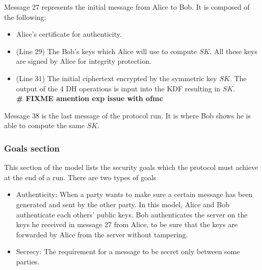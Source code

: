 Message 27 represents the initial message from Alice to Bob. It is composed of the following:
\begin{itemize}
	\item Alice's certificate for authenticity.
	\item (Line 29) The Bob's keys which Alice will use to compute $SK$. All these keys are signed by Alice for integrity protection.
	\item (Line 31) The initial ciphertext encrypted by the symmetric key $SK$. The output of the 4 DH operations is input into the KDF resulting in $SK$. \\\textbf{\LARGE \# FIXME amention exp issue with ofmc}
\end{itemize}
\par
Message 38 is the last message of the protocol run. It is where Bob shows he is able to compute the same $SK$. 
\subsubsection{Goals section}
This section of the model lists the security goals which the protocol must achieve at the end of a run. There are two types of goals
\begin{itemize}
	\item Authenticity: When a party wants to make sure a certain message has been generated and sent by the other party. In this model, Alice and Bob authenticate each others' public keys. Bob authenticates the server on the keys he received in message 27 from Alice, to be sure that the keys are forwarded by Alice from the server without tampering.
	\item Secrecy: The requirement for a message to be secret only between some parties.
\end{itemize}

%



